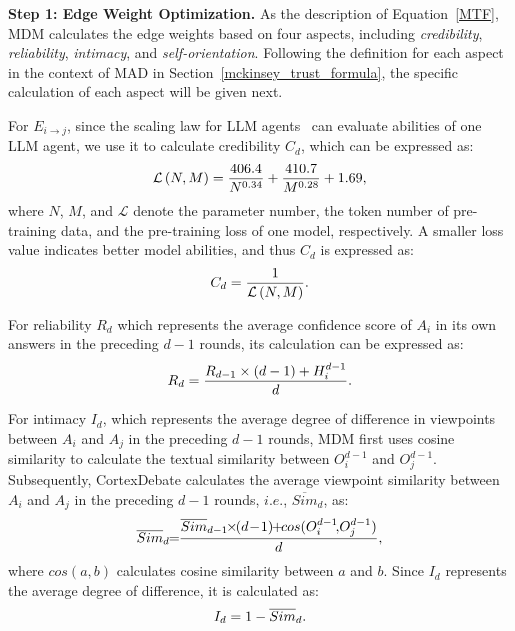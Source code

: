 \textbf{Step 1: Edge Weight Optimization.} As the description of Equation~\eqref{MTF}, MDM calculates the edge weights based on four aspects, including \textit{credibility}, \textit{reliability}, \textit{intimacy}, and \textit{self-orientation}. Following the definition for each aspect in the context of MAD in Section~\ref{mckinsey_trust_formula}, the specific calculation of each aspect will be given next.

For $E_{i\to j}$, since the scaling law for LLM agents~\cite{hoffmann2022training} can evaluate abilities of one LLM agent, we use it to calculate credibility $C_{d}$, which can be expressed as:
\begin{equation}
\setlength{\abovedisplayskip}{1mm}
\setlength{\belowdisplayskip}{1mm}
\label{3}
  \mathcal{L}\left ( N,M \right ) = \frac{406.4}{N^{0.34} } +  \frac{410.7}{M^{0.28} }+  1.69, 
\end{equation}
\noindent where $N$, $M$, and $\mathcal{L}$ denote the parameter number, the token number of pre-training data, and the pre-training loss of one model, respectively. A smaller loss value indicates better model abilities, and thus $C_{d}$ is expressed as:
\begin{equation}
\setlength{\abovedisplayskip}{1mm}
\setlength{\belowdisplayskip}{1mm}
\label{4}
  C_{d} = \frac{1}{\mathcal{L}\left ( N,M \right )}. 
\end{equation}

For reliability $R_{d}$ which represents the average confidence score of $A_{i}$ in its own answers in the preceding $d-1$ rounds, its calculation can be expressed as:
\begin{equation}
\setlength{\abovedisplayskip}{1mm}
\setlength{\belowdisplayskip}{1mm}
\label{5}
  R_{d} = \frac{R_{d-1} \times (d-1)+  H_{i}^{d-1}}{d}.
\end{equation}

For intimacy $I_{d}$, which represents the average degree of difference in viewpoints between $A_{i}$ and $A_{j}$ in the preceding $d-1$ rounds, MDM first uses cosine similarity to calculate the textual similarity between $O_{i}^{d-1}$ and $O_{j}^{d-1}$. Subsequently, CortexDebate calculates the average viewpoint similarity between $A_{i}$ and $A_{j}$ in the preceding $d-1$ rounds, $\textit{i.e.}$, $\overline{{Sim}}_{d}$, as:
\begin{equation}
\setlength{\abovedisplayskip}{1mm}
\setlength{\belowdisplayskip}{1mm}
\label{6}
  \overline{{Sim}}_{d} \! \! = \!\! \frac{\overline{{Sim}}_{d-1} \!\! \times \!\! (d\!-\!1) \!\! + \!\! cos(O_{i}^{d-1} \! , \! O_{j}^{d-1})}{d},
\end{equation}
where $cos(a,b)$ calculates cosine similarity between $a$ and $b$. Since $I_{d}$ represents the average degree of difference, it is calculated as:
\begin{equation}
\setlength{\abovedisplayskip}{1mm}
\setlength{\belowdisplayskip}{1mm}
\label{7}
  I_{d} = 1-\overline{{Sim}}_{d}.
\end{equation}

